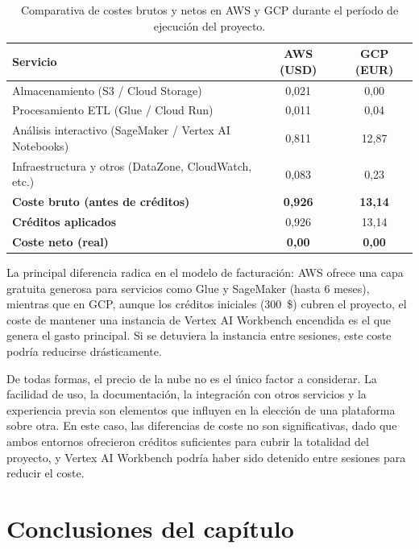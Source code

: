 \begin{table}[htbp]
	\centering
	\footnotesize
	\renewcommand{\arraystretch}{1.25}
	\setlength{\tabcolsep}{6pt}
	\begin{tabular}{p{6.8cm}cc}
		\hline
		\textbf{Servicio} & \textbf{AWS (USD)} & \textbf{GCP (EUR)} \\
		\hline
		Almacenamiento (S3 / Cloud Storage) & 0,021 & 0,00 \\
		Procesamiento ETL (Glue / Cloud Run) & 0,011 & 0,04 \\
		Análisis interactivo (SageMaker / Vertex AI Notebooks) & 0,811 & 12,87 \\
		Infraestructura y otros (DataZone, CloudWatch, etc.) & 0,083 & 0,23 \\
		\hline
		\textbf{Coste bruto (antes de créditos)} & \textbf{0,926} & \textbf{13,14} \\
		\textbf{Créditos aplicados} & 0,926 & 13,14 \\
		\textbf{Coste neto (real)} & \textbf{0,00} & \textbf{0,00} \\
		\hline
	\end{tabular}
	\caption{Comparativa de costes brutos y netos en AWS y GCP durante el período de ejecución del proyecto.}
	\label{tab:costes_cloud}
\end{table}

La principal diferencia radica en el modelo de facturación: AWS ofrece una capa gratuita generosa para servicios como Glue y SageMaker (hasta 6 meses), mientras que en GCP, aunque los créditos iniciales (300~\$) cubren el proyecto, el coste de mantener una instancia de Vertex AI Workbench encendida es el que genera el gasto principal. Si se detuviera la instancia entre sesiones, este coste podría reducirse drásticamente.

De todas formas, el precio de la nube no es el único factor a considerar. La facilidad de uso, la documentación, la integración con otros servicios y la experiencia previa son elementos que influyen en la elección de una plataforma sobre otra. En este caso, las diferencias de coste no son significativas, dado que ambos entornos ofrecieron créditos suficientes para cubrir la totalidad del proyecto, y Vertex AI Workbench podría haber sido detenido entre sesiones para reducir el coste.


\section{Conclusiones del capítulo}

